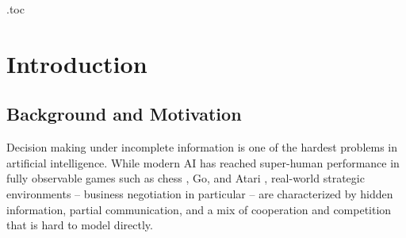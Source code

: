 \documentclass[11pt, a4paper, oneside, openany]{report}
\begin{document}
\setcounter{page}{22}


\makeatletter
{}
\immediate\openout\tf@toc\jobname.toc\relax
\makeatother

\chapter{Introduction}
\label{ch:intro}

\section{Background and Motivation}

Decision making under incomplete information is one of the hardest problems in artificial intelligence. While modern AI has reached super-human performance in fully observable games such as chess \citep{silver2017alphazero}, Go, and Atari \citep{schrittwieser2019muzero}, real-world strategic environments -- business negotiation in particular -- are characterized by hidden information, partial communication, and a mix of cooperation and competition that is hard to model directly.
\end{document}
